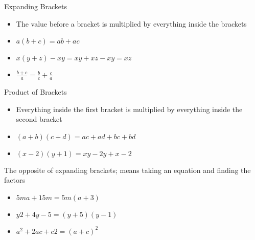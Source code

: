 \begin{frame}
Expanding Brackets
\begin{itemize}
	\item The value before a bracket is multiplied by everything inside the brackets
	\item $ a(b + c)  =  ab + ac$
	\item $ x(y + z) - xy  = xy+xz-xy  =  xz$
	\item $ \frac{b + c}{a}  = \frac{b}{c} + \frac{c}{a} $
\end{itemize}
Product of Brackets
\begin{itemize}
	\item Everything inside the first bracket is multiplied by everything inside the second bracket
	\item $(a + b)(c + d)  =  ac + ad + bc + bd$
	\item $ (x - 2)(y + 1)  =  xy - 2y + x - 2$
\end{itemize}
\end{frame}
\begin{frame}
The opposite of expanding brackets; means taking an equation and finding the factors
\begin{itemize}
	\item $ 5ma + 15 m  =  5m(a + 3)$
	\item $ y2+4y-5  =  (y + 5)(y - 1)$
	\item $ a^2 + 2ac + c2  =  (a + c)^2$
\end{itemize}
\end{frame}

